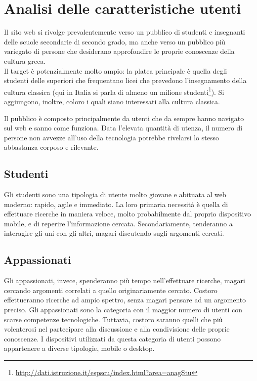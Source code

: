 \section{Analisi delle caratteristiche utenti}
Il sito web si rivolge prevalentemente verso un pubblico di studenti e insegnanti delle scuole secondarie di secondo grado, ma anche verso un pubblico più variegato di persone che desiderano approfondire le proprie conoscenze della cultura greca.\\
Il target è potenzialmente molto ampio: la platea principale è quella degli studenti delle superiori che frequentano licei che prevedono l'insegnamento della cultura classica (qui in Italia si parla di almeno un milione studenti\footnote{\url{http://dati.istruzione.it/espscu/index.html?area=anagStu}}). Si aggiungono, inoltre, coloro i quali siano interessati alla cultura classica.

Il pubblico è composto principalmente da utenti che da sempre hanno navigato sul web e sanno come funziona. Data l'elevata quantità di utenza, il numero di persone non avvezze all'uso della tecnologia potrebbe rivelarsi lo stesso abbastanza corposo e rilevante.

\subsection{Studenti}
Gli studenti sono una tipologia di utente molto giovane e abituata al web moderno: rapido, agile e immediato. La loro primaria necessità è quella di effettuare ricerche in maniera veloce, molto probabilmente dal proprio dispositivo mobile, e di reperire l'informazione cercata.
Secondariamente, tenderanno a interagire gli uni con gli altri, magari discutendo sugli argomenti cercati.

\subsection{Appassionati}
Gli appassionati, invece, spenderanno più tempo nell'effettuare ricerche, magari cercando argomenti correlati a quello originariamente cercato. Costoro effettueranno ricerche ad ampio spettro, senza magari pensare ad un argomento preciso. Gli appassionati sono la categoria con il maggior numero di utenti con scarse competenze tecnologiche. Tuttavia, costoro saranno quelli che più volenterosi nel partecipare alla discussione e alla condivisione delle proprie conoscenze. I dispositivi utilizzati da questa categoria di utenti possono appartenere a diverse tipologie, mobile o desktop. 


